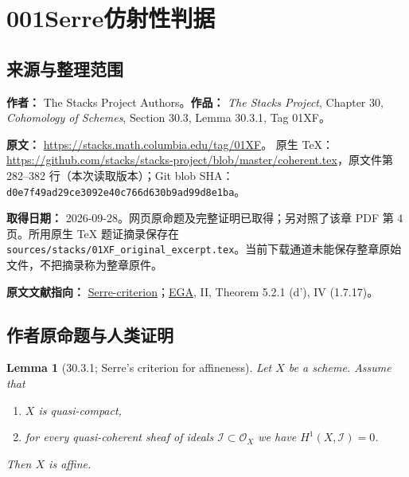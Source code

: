 \documentclass[UTF8,11pt]{ctexart}
\newtheorem*{lemma}{Lemma}
\begin{document}
\section*{001\quad Serre仿射性判据}
\subsection*{来源与整理范围}
\textbf{作者：} The Stacks Project Authors。\textbf{作品：} \emph{The Stacks Project}, Chapter 30, \emph{Cohomology of Schemes}, Section 30.3, Lemma 30.3.1, Tag 01XF。

\textbf{原文：} \url{https://stacks.math.columbia.edu/tag/01XF}。
原生 TeX：\url{https://github.com/stacks/stacks-project/blob/master/coherent.tex}，原文件第 282--382 行（本次读取版本）；Git blob SHA：\texttt{d0e7f49ad29ce3092e40c766d630b9ad99d8e1ba}。

\textbf{取得日期：} 2026-09-28。网页原命题及完整证明已取得；另对照了该章 PDF 第 4 页。所用原生 TeX 题证摘录保存在 \texttt{sources/stacks/01XF\_original\_excerpt.tex}。当前下载通道未能保存整章原始文件，不把摘录称为整章原件。

\textbf{原文文献指向：} \href{https://stacks.math.columbia.edu/bibliography/Serre-criterion}{Serre-criterion}；\href{https://stacks.math.columbia.edu/bibliography/EGA}{EGA}, II, Theorem 5.2.1 (d'), IV (1.7.17)。


\subsection*{作者原命题与人类证明}
\begin{lemma}[30.3.1; Serre's criterion for affineness]
Let $X$ be a scheme.
Assume that
\begin{enumerate}
\item $X$ is quasi-compact,
\item for every quasi-coherent sheaf of ideals
$\mathcal{I} \subset \mathcal{O}_X$ we have $H^1(X, \mathcal{I}) = 0$.
\end{enumerate}
Then $X$ is affine.
\end{lemma}
\end{document}
